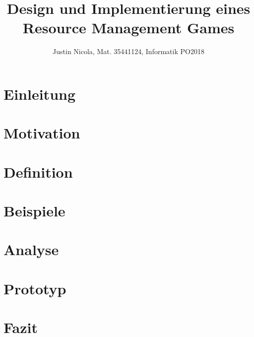 \documentclass[12pt]{extarticle}
\title{Design und Implementierung eines Resource Management Games}
\author{Justin Nicola, Mat. 35441124, Informatik PO2018}
\begin{document}






\maketitle
\section{Einleitung}


\section{Motivation}


\section{Definition}


\section{Beispiele}


\section{Analyse}


\section{Prototyp}


\section{Fazit}


\newpage
\printbibliography

\newpage

\end{document}
